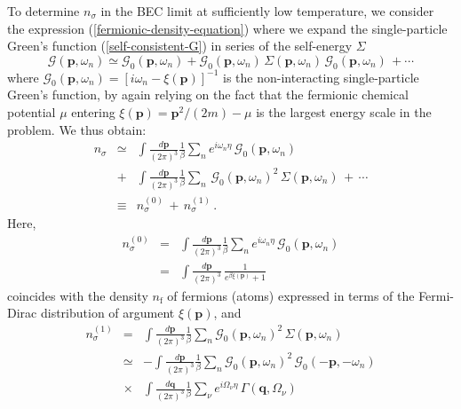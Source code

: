 \documentclass[pra,twocolumn,aps,amssymb,showpacs,superscriptaddress]{revtex4-1}
\begin{document}
To determine $n_{\sigma}$ in the BEC limit at sufficiently low temperature, we consider the expression (\ref{fermionic-density-equation}) where we expand the single-particle Green's function (\ref{self-consistent-G}) in series of the self-energy $\Sigma$
\begin{equation}
\mathcal{G}(\mathbf{p},\omega_{n}) \simeq \mathcal{G}_{0}(\mathbf{p},\omega_{n}) + \mathcal{G}_{0}(\mathbf{p},\omega_{n}) \, \Sigma(\mathbf{p},\omega_{n}) \, \mathcal{G}_{0}(\mathbf{p},\omega_{n}) \, + \cdots
\label{G-expanded}
\end{equation}
where $\mathcal{G}_{0}(\mathbf{p},\omega_{n}) = [i \omega_{n} - \xi(\mathbf{p})]^{-1}$ is the non-interacting single-particle Green's function, 
by again relying on the fact that the fermionic chemical potential $\mu$ entering $\xi(\mathbf{p}) = \mathbf{p}^{2}/(2m) - \mu$ is the largest energy scale in the problem.
We thus obtain:
\begin{eqnarray}
n_{\sigma} & \simeq & \int \! \frac{d\mathbf{p}}{(2 \pi)^{3}} \frac{1}{\beta} \sum_{n} e^{i \omega_{n} \eta} \, \mathcal{G}_{0}(\mathbf{p},\omega_{n})  
\nonumber \\
& + & \int \! \frac{d\mathbf{p}}{(2 \pi)^{3}} \frac{1}{\beta} \sum_{n} \, \mathcal{G}_{0}(\mathbf{p},\omega_{n})^{2} \, \Sigma(\mathbf{p},\omega_{n}) \, + \, \cdots
\nonumber \\
& \equiv & n_{\sigma}^{(0)} \, + \, n_{\sigma}^{(1)} \, .
\label{approximate-fermionic-density-equation}
\end{eqnarray}
Here,
\begin{eqnarray}
n_{\sigma}^{(0)} & = & \int \! \frac{d\mathbf{p}}{(2 \pi)^{3}} \frac{1}{\beta} \sum_{n} e^{i \omega_{n} \eta} \, \mathcal{G}_{0}(\mathbf{p},\omega_{n}) 
\nonumber \\
& = &  \int \! \frac{d\mathbf{p}}{(2 \pi)^{3}} \, \frac{1}{e^{\beta \xi(\mathbf{p})} + 1}
\label{fermionic-density-zero}
\end{eqnarray}
coincides with the density $n_{\mathrm{f}}$ of fermions (atoms) expressed in terms of the Fermi-Dirac distribution of argument $\xi(\mathbf{p})$, and
\begin{eqnarray}
n_{\sigma}^{(1)} & = & \int \! \frac{d\mathbf{p}}{(2 \pi)^{3}} \frac{1}{\beta} \sum_{n} \mathcal{G}_{0}(\mathbf{p},\omega_{n})^{2} \, \Sigma(\mathbf{p},\omega_{n}) 
\nonumber \\
& \simeq & - \int \! \frac{d\mathbf{p}}{(2 \pi)^{3}} \frac{1}{\beta} \sum_{n} \mathcal{G}_{0}(\mathbf{p},\omega_{n})^{2}\,  \mathcal{G}_{0}(-\mathbf{p},-\omega_{n})
\nonumber \\
& \times & \int \! \frac{d\mathbf{q}}{(2 \pi)^{3}} \frac{1}{\beta} \sum_{\nu} e^{i \Omega_{\nu} \eta} \, \Gamma(\mathbf{q},\Omega_{\nu})
\label{fermionic-density-uno}
\end{eqnarray}
\end{document}

